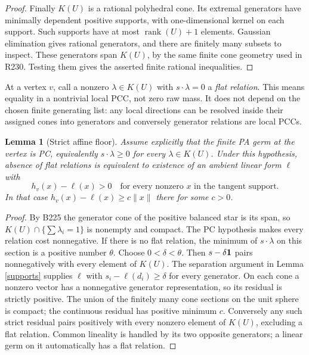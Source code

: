 \documentclass[11pt]{article}
\newtheorem{lemma}[theorem]{Lemma}
\begin{document}
\begin{proof}
Finally \(K(U)\) is a rational polyhedral cone. Its extremal generators
have minimally dependent positive supports, with one-dimensional kernel
on each support. Such supports have at most
\(\operatorname{rank}(U)+1\) elements. Gaussian elimination gives rational
generators, and there are finitely many subsets to inspect. These
generators span \(K(U)\), by the same finite cone geometry used in R230.
Testing them gives the asserted finite rational inequalities.
\end{proof}

At a vertex \(v\), call a nonzero \(\lambda\in K(U)\) with
\(s\cdot\lambda=0\) a \emph{flat relation}. This means equality in a
nontrivial local PCC, not zero raw mass. It does not depend on the chosen
finite generating list: any local directions can be resolved inside
their assigned cones into generators and conversely generator relations
are local PCCs.

\begin{lemma}[Strict affine floor]\label{floor}
Assume explicitly that the finite PA germ at the vertex is PC, equivalently
$s\cdot\lambda\geq0$ for every $\lambda\in K(U)$. Under this hypothesis,
absence of flat relations is equivalent to existence of an
ambient linear form \(\ell\) with
\[
 h_v(x)-\ell(x)>0\quad
       \text{for every nonzero }x\text{ in the tangent support}.
\]
In that case \(h_v(x)-\ell(x)\geq c\|x\|\) there for some \(c>0\).
\end{lemma}
\begin{proof}
By B225 the generator cone of the positive balanced star is its span,
so \(K(U)\cap\{\sum\lambda_i=1\}\) is nonempty and compact.
The PC hypothesis makes every relation cost nonnegative. If there is no
flat relation, the minimum of \(s\cdot\lambda\) on this
section is a positive number \(\theta\). Choose \(0<\delta<\theta\).
Then \(s-\delta{\bf1}\) pairs nonnegatively with every element of \(K(U)\).
The separation argument in Lemma \ref{supports} supplies \(\ell\) with
\(s_i-\ell(d_i)\geq\delta\) for every generator.
On each cone a nonzero vector has a nonnegative generator
representation, so its residual is strictly positive. The union of the
finitely many cone sections on the unit sphere is compact; the continuous
residual has positive minimum \(c\). Conversely any such strict residual
pairs positively with every nonzero element of \(K(U)\), excluding a flat
relation. Common lineality is handled by its two opposite generators;
a linear germ on it automatically has a flat relation.
\end{proof}
\end{document}
